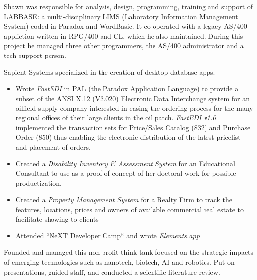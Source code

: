 \documentclass[line,margin,hidelinks]{res}
\begin{document}
\begin{resume}
\begin{position}
\end{position}


\begin{position}
  Shawn was responsible for analysis, design, programming,
  training and support of LABBASE: a multi-disciplinary LIMS
  (Laboratory Information Management System) coded in Paradox and
  WordBasic.  It co-operated with a legacy AS/400 appliction written
  in RPG/400 and CL, which he also maintained.  During this project he
  managed three other programmers, the AS/400 administrator and a tech
  support person.
\end{position}


\begin{position}
Sapient Systems specialized in the creation of desktop database apps.
\begin{itemize}
\item Wrote {\it FastEDI} in PAL (the Paradox Application Language)  to
	provide a subset of the
	ANSI X.12 (V3.020) Electronic Data Interchange system for an
	oilfield supply company interested in easing the ordering process for
	the many regional offices of their large clients in the oil patch.
	{\it FastEDI v1.0} implemented
	the transaction sets for Price/Sales Catalog (832) and
	Purchase Order (850) thus enabling the electronic distribution
	of the latest pricelist and placement of orders.
\item Created a {\it Disability Inventory \& Assessment System }
	for an Educational Consultant to use as a proof of concept of
	her doctoral work for possible productization.
\item Created a {\it Property Management System} for a Realty Firm to
	track the features, locations, prices and owners of
	available commercial real estate to facilitate showing to clients
\item Attended ``NeXT Developer Camp`` and wrote \emph{Elements.app}
\end{itemize}
\end{position}


\begin{position}
  Founded and managed this non-profit think tank focused on the strategic impacts of
  emerging technologies such as nanotech, biotech, AI and robotics.
  Put on presentations, guided staff, and conducted a scientific literature review.
\end{position}



\end{resume}
\end{document}
